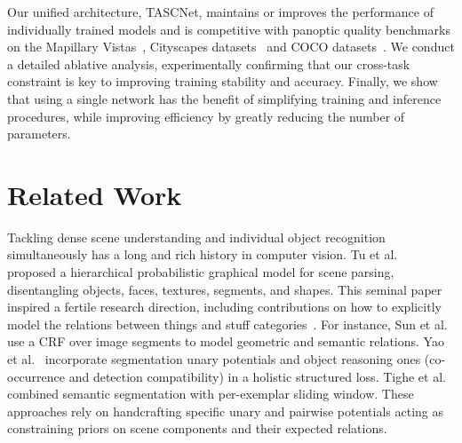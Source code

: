 \documentclass[10pt,twocolumn]{article}
\begin{document}
Our unified architecture, TASCNet, maintains or improves the performance of individually trained models and is competitive with panoptic quality benchmarks on the Mapillary Vistas~\cite{neuhold2017mapillary-vistas}, Cityscapes datasets~\cite{Cordts2016Cityscapes} and COCO datasets~\cite{lin2014microsoft}.
We conduct a detailed ablative analysis, experimentally confirming that our cross-task constraint is key to improving training stability and accuracy.
Finally, we show that using a single network has the benefit of simplifying training and inference procedures, while improving efficiency by greatly reducing the number of parameters.




 
\section{Related Work}

Tackling dense scene understanding and individual object recognition simultaneously has a long and rich history in computer vision.
Tu et al.~\cite{tu2005image} proposed a hierarchical probabilistic graphical model for scene parsing, disentangling objects, faces, textures, segments, and shapes.
This seminal paper inspired a fertile research direction, including contributions on how to explicitly model the relations between things and stuff categories~\cite{sun2014relating, yao2012describing, tighe2014scene, tighe2013finding, Mottaghi-2014}. For instance, Sun et al.~\cite{sun2014relating} use a CRF over image segments to model geometric and semantic relations. Yao et al.~\cite{yao2012describing} incorporate segmentation unary potentials and object reasoning ones (co-occurrence and detection compatibility) in a holistic structured loss. Tighe et al.~\cite{tighe2013finding} combined semantic segmentation with per-exemplar sliding window.
These approaches rely on handcrafting specific unary and pairwise potentials acting as constraining priors on scene components and their expected relations.
\end{document}
